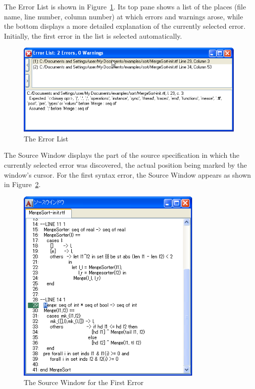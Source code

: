 \documentclass[\pformat,12pt]{article}
\newcommand{\guicmd}[1]{{\sf #1}}
\begin{document}
The \guicmd{Error List} is shown in Figure~\ref{fig:error}. Its top
pane shows a list of the places (file name, line number, column
number) at which errors and warnings arose, while the bottom
displays a more detailed explanation of the currently selected
error. Initially, the first error in the list is selected
automatically.


\begin{figure}[tbh]
\begin{center}
\includegraphics[width=\textwidth]{errorList-ppENG.png}
\caption{The Error List}
\label{fig:error}
\end{center}
\end{figure}

The \guicmd{Source Window} displays the part of the source
specification in which the currently selected error was discovered,
the actual position being marked by the window's cursor. For the first
syntax error, the \guicmd{Source Window} appears as shown in
Figure~\ref{fig:source1}.

\begin{figure}[tbh]
\begin{center}
\includegraphics[width=9cm]{sourceWindow-pp.png}
\caption{The Source Window for the First Error}
\label{fig:source1}
\end{center}
\end{figure}
\end{document}
